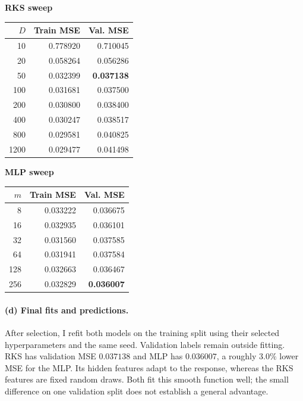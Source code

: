 \begin{center}
\begin{minipage}[t]{0.47\textwidth}
\centering
\textbf{RKS sweep}\\[5pt]
\begin{tabular}{rrr}
\toprule
$D$ & Train MSE & Val. MSE\\
\midrule
10 & 0.778920 & 0.710045\\
20 & 0.058264 & 0.056286\\
50 & 0.032399 & \textbf{0.037138}\\
100 & 0.031681 & 0.037500\\
200 & 0.030800 & 0.038400\\
400 & 0.030247 & 0.038517\\
800 & 0.029581 & 0.040825\\
1200 & 0.029477 & 0.041498\\
\bottomrule
\end{tabular}
\end{minipage}\hfill
\begin{minipage}[t]{0.47\textwidth}
\centering
\textbf{MLP sweep}\\[5pt]
\begin{tabular}{rrr}
\toprule
$m$ & Train MSE & Val. MSE\\
\midrule
8 & 0.033222 & 0.036675\\
16 & 0.032935 & 0.036101\\
32 & 0.031560 & 0.037585\\
64 & 0.031941 & 0.037584\\
128 & 0.032663 & 0.036467\\
256 & 0.032829 & \textbf{0.036007}\\
\bottomrule
\end{tabular}
\end{minipage}
\end{center}

\paragraph{(d) Final fits and predictions.} After selection, I refit both models on the training split using their selected hyperparameters and the same seed. Validation labels remain outside fitting. RKS has validation MSE $0.037138$ and MLP has $0.036007$, a roughly $3.0\%$ lower MSE for the MLP. Its hidden features adapt to the response, whereas the RKS features are fixed random draws. Both fit this smooth function well; the small difference on one validation split does not establish a general advantage.

